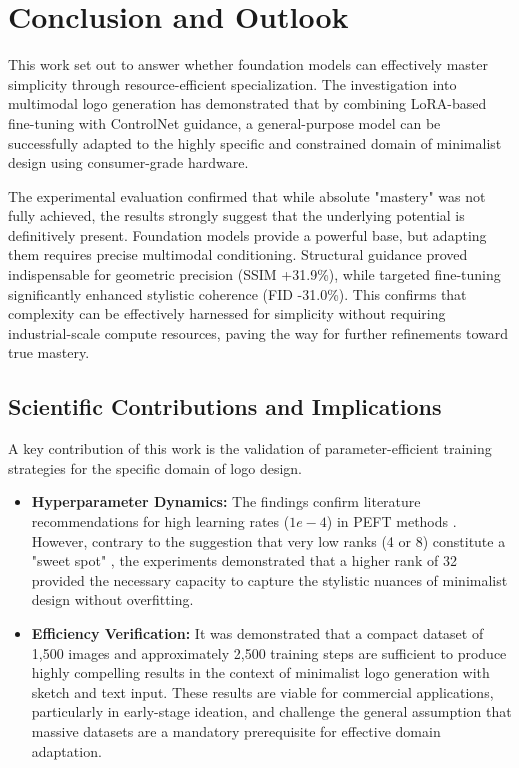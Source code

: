 \section{Conclusion and Outlook}\label{sec:fazit}

This work set out to answer whether foundation models can effectively master simplicity through resource-efficient specialization. The investigation into multimodal logo generation has demonstrated that by combining LoRA-based fine-tuning with ControlNet guidance, a general-purpose model can be successfully adapted to the highly specific and constrained domain of minimalist design using consumer-grade hardware.

The experimental evaluation confirmed that while absolute "mastery" was not fully achieved, the results strongly suggest that the underlying potential is definitively present. Foundation models provide a powerful base, but adapting them requires precise multimodal conditioning. Structural guidance proved indispensable for geometric precision (SSIM +31.9\%), while targeted fine-tuning significantly enhanced stylistic coherence (FID -31.0\%). This confirms that complexity can be effectively harnessed for simplicity without requiring industrial-scale compute resources, paving the way for further refinements toward true mastery.

\subsection{Scientific Contributions and Implications}
A key contribution of this work is the validation of parameter-efficient training strategies for the specific domain of logo design.
\begin{itemize}
    \item \textbf{Hyperparameter Dynamics:} The findings confirm literature recommendations for high learning rates ($1e-4$) in PEFT methods \cite{HU2021}. However, contrary to the suggestion that very low ranks (4 or 8) constitute a "sweet spot" \cite{HU2021}, the experiments demonstrated that a higher rank of 32 provided the necessary capacity to capture the stylistic nuances of minimalist design without overfitting.
    \item \textbf{Efficiency Verification:} It was demonstrated that a compact dataset of 1,500 images and approximately 2,500 training steps are sufficient to produce highly compelling results in the context of minimalist logo generation with sketch and text input. These results are viable for commercial applications, particularly in early-stage ideation, and challenge the general assumption that massive datasets are a mandatory prerequisite for effective domain adaptation.
\end{itemize}

